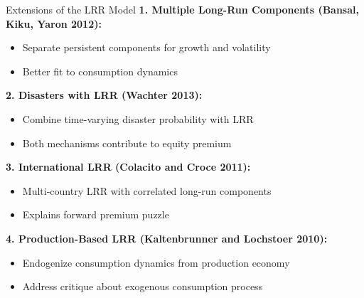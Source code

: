 \documentclass{beamer}
\begin{document}
\begin{frame}{Extensions of the LRR Model}
    \textbf{1. Multiple Long-Run Components (Bansal, Kiku, Yaron 2012):}
    \begin{itemize}
        \item Separate persistent components for growth and volatility
        \item Better fit to consumption dynamics
    \end{itemize}
    
    \textbf{2. Disasters with LRR (Wachter 2013):}
    \begin{itemize}
        \item Combine time-varying disaster probability with LRR
        \item Both mechanisms contribute to equity premium
    \end{itemize}
    
    \textbf{3. International LRR (Colacito and Croce 2011):}
    \begin{itemize}
        \item Multi-country LRR with correlated long-run components
        \item Explains forward premium puzzle
    \end{itemize}
    
    \textbf{4. Production-Based LRR (Kaltenbrunner and Lochstoer 2010):}
    \begin{itemize}
        \item Endogenize consumption dynamics from production economy
        \item Address critique about exogenous consumption process
    \end{itemize}
\end{frame}
\end{document}
